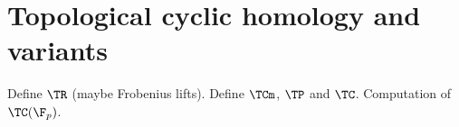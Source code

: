 \chapter{Topological cyclic homology and variants}
Define $\TR$ (maybe Frobenius lifts). Define $\TCm$, $\TP$ and $\TC$.
Computation of $\TC(\F_p)$.
